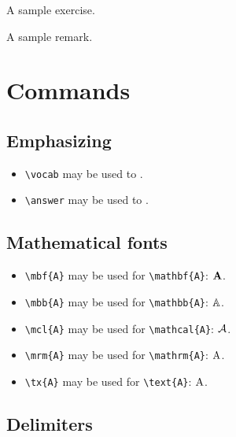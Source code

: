 \documentclass{mszreport}
\begin{document}
\begin{exercise}
    A sample exercise.
\end{exercise}

\begin{remark}
    A sample remark.
\end{remark}

\chapter{Commands}

\section{Emphasizing}

\begin{itemize}
    \item \verb|\vocab| may be used to .
    \item \verb|\answer| may be used to .
\end{itemize}

\section{Mathematical fonts}

\begin{itemize}
    \item \verb|\mbf{A}| may be used for \verb|\mathbf{A}|: $\mathbf{A}$.
    \item \verb|\mbb{A}| may be used for \verb|\mathbb{A}|: $\mathbb{A}$.
    \item \verb|\mcl{A}| may be used for \verb|\mathcal{A}|: $\mathcal{A}$.
    \item \verb|\mrm{A}| may be used for \verb|\mathrm{A}|: $\mathrm{A}$.
    \item \verb|\tx{A}| may be used for \verb|\text{A}|: $\text{A}$.
\end{itemize}

\section{Delimiters}
\end{document}
